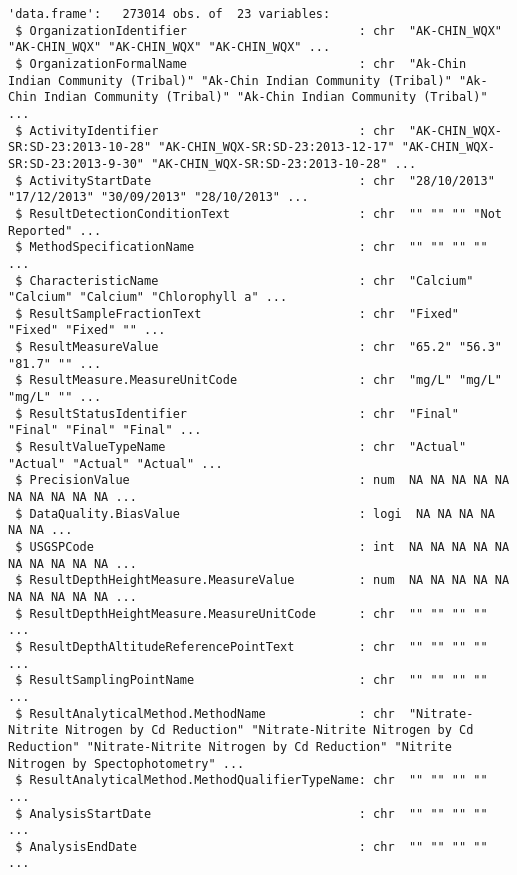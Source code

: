 \documentclass[
  12pt,
]{article}
\newenvironment{Shaded}{\begin{snugshade}}{\end{snugshade}}
\newcommand{\FunctionTok}[1]{\textcolor[rgb]{0.28,0.35,0.67}{#1}}
\newcommand{\NormalTok}[1]{\textcolor[rgb]{0.00,0.23,0.31}{#1}}
\newcommand{\SpecialCharTok}[1]{\textcolor[rgb]{0.37,0.37,0.37}{#1}}
\begin{document}
\begin{verbatim}
'data.frame':   273014 obs. of  23 variables:
 $ OrganizationIdentifier                        : chr  "AK-CHIN_WQX" "AK-CHIN_WQX" "AK-CHIN_WQX" "AK-CHIN_WQX" ...
 $ OrganizationFormalName                        : chr  "Ak-Chin Indian Community (Tribal)" "Ak-Chin Indian Community (Tribal)" "Ak-Chin Indian Community (Tribal)" "Ak-Chin Indian Community (Tribal)" ...
 $ ActivityIdentifier                            : chr  "AK-CHIN_WQX-SR:SD-23:2013-10-28" "AK-CHIN_WQX-SR:SD-23:2013-12-17" "AK-CHIN_WQX-SR:SD-23:2013-9-30" "AK-CHIN_WQX-SR:SD-23:2013-10-28" ...
 $ ActivityStartDate                             : chr  "28/10/2013" "17/12/2013" "30/09/2013" "28/10/2013" ...
 $ ResultDetectionConditionText                  : chr  "" "" "" "Not Reported" ...
 $ MethodSpecificationName                       : chr  "" "" "" "" ...
 $ CharacteristicName                            : chr  "Calcium" "Calcium" "Calcium" "Chlorophyll a" ...
 $ ResultSampleFractionText                      : chr  "Fixed" "Fixed" "Fixed" "" ...
 $ ResultMeasureValue                            : chr  "65.2" "56.3" "81.7" "" ...
 $ ResultMeasure.MeasureUnitCode                 : chr  "mg/L" "mg/L" "mg/L" "" ...
 $ ResultStatusIdentifier                        : chr  "Final" "Final" "Final" "Final" ...
 $ ResultValueTypeName                           : chr  "Actual" "Actual" "Actual" "Actual" ...
 $ PrecisionValue                                : num  NA NA NA NA NA NA NA NA NA NA ...
 $ DataQuality.BiasValue                         : logi  NA NA NA NA NA NA ...
 $ USGSPCode                                     : int  NA NA NA NA NA NA NA NA NA NA ...
 $ ResultDepthHeightMeasure.MeasureValue         : num  NA NA NA NA NA NA NA NA NA NA ...
 $ ResultDepthHeightMeasure.MeasureUnitCode      : chr  "" "" "" "" ...
 $ ResultDepthAltitudeReferencePointText         : chr  "" "" "" "" ...
 $ ResultSamplingPointName                       : chr  "" "" "" "" ...
 $ ResultAnalyticalMethod.MethodName             : chr  "Nitrate-Nitrite Nitrogen by Cd Reduction" "Nitrate-Nitrite Nitrogen by Cd Reduction" "Nitrate-Nitrite Nitrogen by Cd Reduction" "Nitrite Nitrogen by Spectophotometry" ...
 $ ResultAnalyticalMethod.MethodQualifierTypeName: chr  "" "" "" "" ...
 $ AnalysisStartDate                             : chr  "" "" "" "" ...
 $ AnalysisEndDate                               : chr  "" "" "" "" ...
\end{verbatim}

\begin{Shaded}
\end{Shaded}
\end{document}
